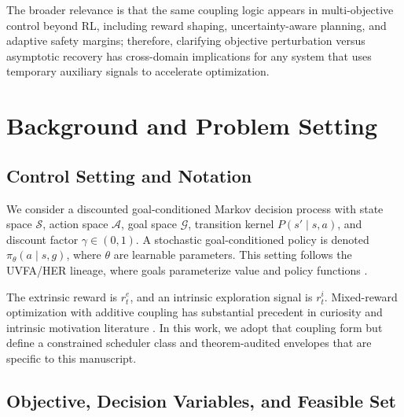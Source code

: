 \documentclass{article} %
\begin{document}
The broader relevance is that the same coupling logic appears in multi-objective control beyond RL, including reward shaping, uncertainty-aware planning, and adaptive safety margins; therefore, clarifying objective perturbation versus asymptotic recovery has cross-domain implications for any system that uses temporary auxiliary signals to accelerate optimization.

\section{Background and Problem Setting}
\label{sec:problem}

\subsection{Control Setting and Notation}

We consider a discounted goal-conditioned Markov decision process with state space $\mathcal{S}$, action space $\mathcal{A}$, goal space $\mathcal{G}$, transition kernel $P(s'\mid s,a)$, and discount factor $\gamma\in(0,1)$. A stochastic goal-conditioned policy is denoted $\pi_\theta(a\mid s,g)$, where $\theta$ are learnable parameters. This setting follows the UVFA/HER lineage, where goals parameterize value and policy functions \citep{ref_universal_value_function_approximators_2015, arxiv1707_01495, arxiv1912_06088}.

The extrinsic reward is $r_t^e$, and an intrinsic exploration signal is $r_t^i$. Mixed-reward optimization with additive coupling has substantial precedent in curiosity and intrinsic motivation literature \citep{arxiv1703_01310, arxiv1810_12894, arxiv1705_05363, arxiv2602_24081}. In this work, we adopt that coupling form but define a constrained scheduler class and theorem-audited envelopes that are specific to this manuscript.

\subsection{Objective, Decision Variables, and Feasible Set}
\end{document}
